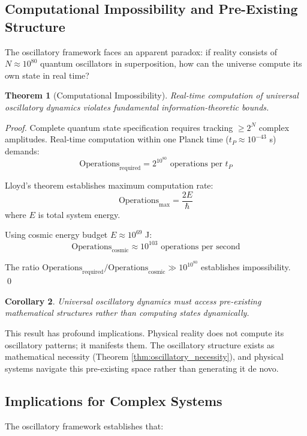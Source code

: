 \documentclass[11pt]{article}
\newtheorem{theorem}{Theorem}[section]
\newtheorem{corollary}[theorem]{Corollary}
\theoremstyle{remark}
\begin{document}
\subsection{Computational Impossibility and Pre-Existing Structure}

The oscillatory framework faces an apparent paradox: if reality consists of $N \approx 10^{80}$ quantum oscillators in superposition, how can the universe compute its own state in real time?

\begin{theorem}[Computational Impossibility]
Real-time computation of universal oscillatory dynamics violates fundamental information-theoretic bounds.
\end{theorem}

\begin{proof}
Complete quantum state specification requires tracking $\geq 2^N$ complex amplitudes. Real-time computation within one Planck time ($t_P \approx 10^{-43}$ s) demands:
$$\text{Operations}_{\text{required}} = 2^{10^{80}} \text{ operations per } t_P$$

Lloyd's theorem establishes maximum computation rate:
$$\text{Operations}_{\text{max}} = \frac{2E}{\hbar}$$
where $E$ is total system energy.

Using cosmic energy budget $E \approx 10^{69}$ J:
$$\text{Operations}_{\text{cosmic}} \approx 10^{103} \text{ operations per second}$$

The ratio $\text{Operations}_{\text{required}}/\text{Operations}_{\text{cosmic}} \gg 10^{10^{80}}$ establishes impossibility. \qed
\end{proof}

\begin{corollary}
Universal oscillatory dynamics must access pre-existing mathematical structures rather than computing states dynamically.
\end{corollary}

This result has profound implications. Physical reality does not compute its oscillatory patterns; it manifests them. The oscillatory structure exists as mathematical necessity (Theorem \ref{thm:oscillatory_necessity}), and physical systems navigate this pre-existing space rather than generating it de novo.

\subsection{Implications for Complex Systems}

The oscillatory framework establishes that:
\end{document}
